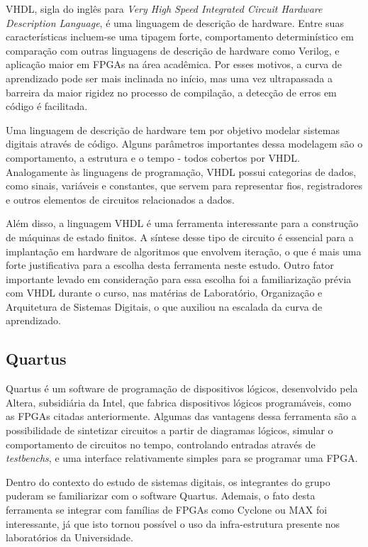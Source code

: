 	VHDL, sigla do inglês para \textit{Very High Speed Integrated Circuit Hardware Description Language}, é uma linguagem de descrição de hardware. Entre suas características incluem-se uma tipagem forte, comportamento determinístico em comparação com outras linguagens de descrição de hardware como Verilog, e aplicação maior em FPGAs na área acadêmica. Por esses motivos, a curva de aprendizado pode ser mais inclinada no início, mas uma vez ultrapassada a barreira da maior rigidez no processo de compilação, a detecção de erros em código é facilitada.
	
	Uma linguagem de descrição de hardware tem por objetivo modelar sistemas digitais através de código. Alguns parâmetros importantes dessa modelagem são o comportamento, a estrutura e o tempo - todos cobertos por VHDL. Analogamente às linguagens de programação, VHDL possui categorias de dados, como sinais, variáveis e constantes, que servem para representar fios, registradores e outros elementos de circuitos relacionados a dados. 
	
	Além disso, a linguagem VHDL é uma ferramenta interessante para a construção de máquinas de estado finitos. A síntese desse tipo de circuito é essencial para a implantação em hardware de algoritmos que envolvem iteração, o que é mais uma forte justificativa para a escolha desta ferramenta neste estudo. Outro fator importante levado em consideração para essa escolha foi a familiarização prévia com VHDL durante o curso, nas matérias de Laboratório, Organização e Arquitetura de Sistemas Digitais, o que auxiliou na escalada da curva de aprendizado.
	
	\subsection{Quartus}\label{soft-quartus}
	
	Quartus é um software de programação de dispositivos lógicos, desenvolvido pela Altera, subsidiária da Intel, que fabrica dispositivos lógicos programáveis, como as FPGAs citadas anteriormente. Algumas das vantagens dessa ferramenta são a possibilidade de sintetizar circuitos a partir de diagramas lógicos,  simular o comportamento de circuitos no tempo, controlando entradas através de \textit{testbenchs}, e uma interface relativamente simples para se programar uma FPGA.
	
	Dentro do contexto do estudo de sistemas digitais, os integrantes do grupo puderam se familiarizar com o software Quartus. Ademais, o fato desta ferramenta se integrar com famílias de FPGAs como Cyclone ou MAX foi interessante, já que isto tornou possível o uso da infra-estrutura presente nos laboratórios da Universidade.
